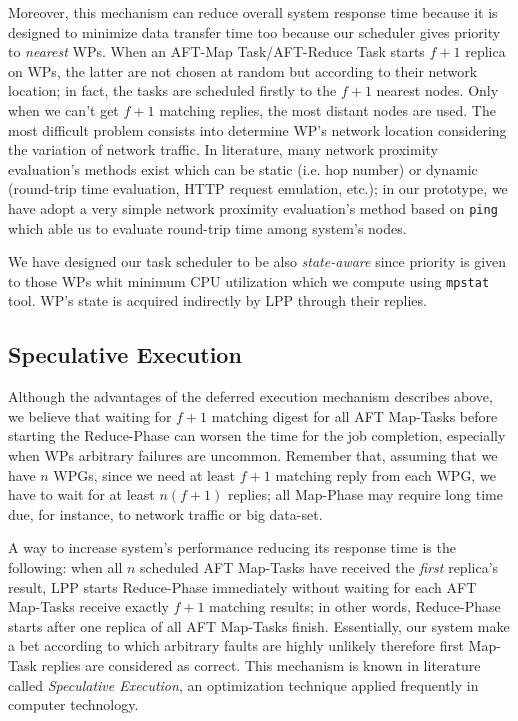 \documentclass[sigchi]{acmart}
\begin{document}
Moreover, this mechanism can reduce overall system response time because it is designed to minimize data transfer time too because our scheduler gives priority to \textit{nearest} WPs. When an AFT-Map Task/AFT-Reduce Task starts $f + 1$ replica on WPs, the latter are not chosen at random but according to their network location; in fact, the tasks are scheduled firstly to the $f + 1$ nearest nodes. Only when we can't get $f + 1$ matching replies, the most distant nodes are used. The most difficult problem consists into determine WP's network location considering the variation of network traffic. In literature, many network proximity evaluation's methods exist which can be static (i.e. hop number) or dynamic (round-trip time evaluation, HTTP request emulation, etc.); in our prototype, we have adopt a very simple network proximity evaluation's method based on \texttt{ping} which able us to evaluate round-trip time among system's nodes. 

We have designed our task scheduler to be also \textit{state-aware} since priority is given to those WPs whit minimum CPU utilization which we compute using \texttt{mpstat} tool. WP's state is acquired indirectly by LPP through their replies.

\subsection{Speculative Execution}

Although the advantages of the deferred execution mechanism describes above, we believe that waiting for $f + 1$ matching digest for all AFT Map-Tasks before starting the Reduce-Phase can worsen the time for the job completion, especially when WPs arbitrary failures are uncommon. Remember that, assuming that we have $n$ WPGs, since we need at least $f + 1$ matching reply from each WPG, we have to wait for at least $n(f + 1)$ replies; all Map-Phase may require long time due, for instance, to network traffic or big  data-set.

A way to increase system's performance reducing its response time is the following: when all $n$ scheduled AFT Map-Tasks have received the \textit{first} replica's result, LPP starts Reduce-Phase immediately without waiting for each AFT Map-Tasks receive exactly $f + 1$ matching results; in other words, Reduce-Phase starts after one replica of all AFT Map-Tasks finish. Essentially, our system make a bet according to which arbitrary faults are highly unlikely therefore first Map-Task replies are considered as correct. This mechanism is known in literature called \textit{Speculative Execution}, an optimization technique applied frequently in computer technology.
\end{document}
